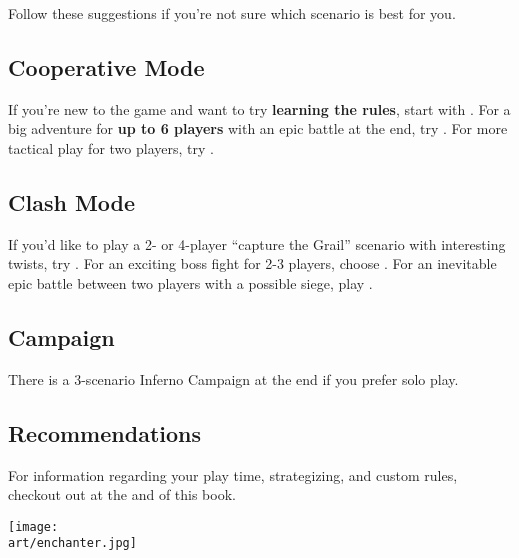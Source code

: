 
\begin{multicols}{2}

Follow these suggestions if you're not sure which scenario is best for you.

\subsection*{Cooperative Mode}

If you're new to the game and want to try \textbf{learning the rules}, start with .
For a big adventure for \textbf{up to 6 players} with an epic battle at the end, try .
For more tactical play for two players, try .

\subsection*{Clash Mode}

If you'd like to play a 2- or 4-player ``capture the Grail'' scenario with interesting twists, try .
For an exciting boss fight for 2-3 players, choose .
For an inevitable epic battle between two players with a possible siege, play .

\subsection*{Campaign}

There is a 3-scenario Inferno  Campaign at the end if you prefer solo play.

\subsection*{Recommendations}

For information regarding your play time, strategizing, and custom rules, checkout out  at the and of this book.

\end{multicols}

\texttt{[image: \\art/enchanter.jpg]}

\vspace*{-1em}
